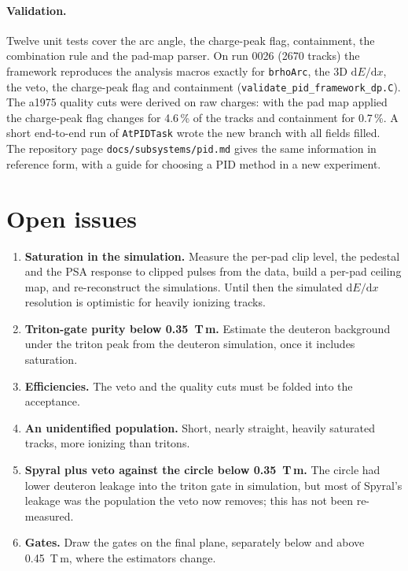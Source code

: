 \documentclass[11pt,a4paper]{article}
\newcommand{\dedx}{$\mathrm{d}E/\mathrm{d}x$}
\newcommand{\code}[1]{\texttt{#1}}
\begin{document}
\paragraph{Validation.} Twelve unit tests cover the arc angle, the charge-peak flag, containment, the combination
rule and the pad-map parser. On run 0026 (2670 tracks) the framework reproduces the analysis macros exactly for
\code{brhoArc}, the 3D \dedx, the veto, the charge-peak flag and containment
(\code{validate\_pid\_framework\_dp.C}). The a1975 quality cuts were derived on raw charges: with the pad map applied
the charge-peak flag changes for 4.6\,\% of the tracks and containment for 0.7\,\%. A short end-to-end run of
\code{AtPIDTask} wrote the new branch with all fields filled. The repository page
\code{docs/subsystems/pid.md} gives the same information in reference form, with a guide for choosing a PID method
in a new experiment.

\section{Open issues}
\label{sec:open}

\begin{enumerate}
\item \textbf{Saturation in the simulation.} Measure the per-pad clip level, the pedestal and the PSA response to
  clipped pulses from the data, build a per-pad ceiling map, and re-reconstruct the simulations. Until then the
  simulated \dedx{} resolution is optimistic for heavily ionizing tracks.
\item \textbf{Triton-gate purity below 0.35~T\,m.} Estimate the deuteron background under the triton peak from the
  deuteron simulation, once it includes saturation.
\item \textbf{Efficiencies.} The veto and the quality cuts must be folded into the acceptance.
\item \textbf{An unidentified population.} Short, nearly straight, heavily saturated tracks, more ionizing than
  tritons.
\item \textbf{Spyral plus veto against the circle below 0.35~T\,m.} The circle had lower deuteron leakage into the
  triton gate in simulation, but most of Spyral's leakage was the population the veto now removes; this has not been
  re-measured.
\item \textbf{Gates.} Draw the gates on the final plane, separately below and above 0.45~T\,m, where the estimators
  change.
\end{enumerate}
\end{document}
